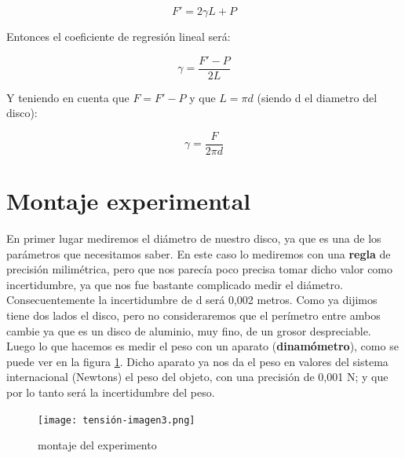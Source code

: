 \documentclass[12pt,a4paper]{book}
\begin{document}
\begin{equation}
F'= 2 \gamma L + P \label{Ec:tension-Fuerza de tensión superficial}
\end{equation}

Entonces el coeficiente de regresión lineal será:

\begin{equation}
\gamma = \dfrac{F'-P}{2L} \label{Ec:tension-Valor de gamma 1}
\end{equation}

Y teniendo en cuenta que $F=F'-P$ y que $L=\pi d$ (siendo d el diametro del disco):

\begin{equation}
\gamma = \dfrac{F}{2\pi d} \label{Ec:tension-Valor de gamma 2}
\end{equation}



\section{Montaje experimental}
En primer lugar mediremos el diámetro de nuestro disco, ya que es una de los parámetros que necesitamos saber. En este caso lo mediremos con una \textbf{regla} de precisión milimétrica, pero que nos parecía poco precisa tomar dicho valor como incertidumbre, ya que nos fue bastante complicado medir el diámetro. Consecuentemente la incertidumbre de d será 0,002 metros. Como ya dijimos tiene dos lados el disco, pero no consideraremos que el perímetro entre ambos cambie ya que es un disco de aluminio, muy fino, de un grosor despreciable. \\

Luego lo que hacemos es medir el peso con un aparato (\textbf{dinamómetro}), como se puede ver en la figura \ref{fig:tension-dinamometro}. Dicho aparato ya nos da el peso en valores del sistema internacional (Newtons) el peso del objeto, con una precisión de 0,001 N; y que por lo tanto será la incertidumbre del peso. \\


\begin{figure}[h!]
\centering
\texttt{[image: tensión-imagen3.png]}
\caption{montaje del experimento}
\label{fig:tension-dinamometro}
\end{figure}
\end{document}
